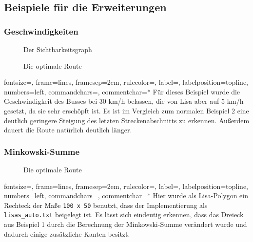 \documentclass[a4paper, notitlepage, 12pt]{scrartcl}
\begin{document}
\subsection{Beispiele für die Erweiterungen}
\subsubsection*{Geschwindigkeiten}
\begin{minipage}[b]{0.45\linewidth}
	\begin{figure}[H]
		
		\caption{Der Sichtbarkeitsgraph}
	\end{figure}
\end{minipage}
\hspace{0.5cm}
\begin{minipage}[b]{0.45\linewidth}
	\begin{figure}[H] 
		\caption{Die optimale Route}
	\end{figure}
\end{minipage}
%
{fontsize=\footnotesize,
	frame=lines,  %
	framesep=2em, %
	rulecolor=\color{Gray},
	label=,
	labelposition=topline,
	numbers=left,
	commandchars=\|\(\), %
	commentchar=*        %
}
Für dieses Beispiel wurde die Geschwindigkeit des Busses bei 30 km/h belassen, die von Lisa aber auf 5 km/h gesetzt, da sie sehr erschöpft ist. Es ist im Vergleich zum normalen Beispiel 2 eine deutlich geringere Steigung des letzten Streckenabschnitts zu erkennen. Außerdem dauert die Route natürlich deutlich länger.
\subsubsection*{Minkowski-Summe}
\begin{figure}[H] 
	\caption{Die optimale Route}
\end{figure}
%
{fontsize=\footnotesize,
	frame=lines,  %
	framesep=2em, %
	rulecolor=\color{Gray},
	label=,
	labelposition=topline,
	numbers=left,
	commandchars=\|\(\), %
	commentchar=*        %
}
Hier wurde als Lisa-Polygon ein Rechteck der Maße \texttt{100 x 50} benutzt, dass der Implementierung als \texttt{lisas\_auto.txt} beigelegt ist. Es lässt sich eindeutig erkennen, dass das Dreieck aus Beispiel 1 durch die Berechnung der Minkowski-Summe verändert wurde und dadurch einige zusätzliche Kanten besitzt.
\newpage
\end{document}
